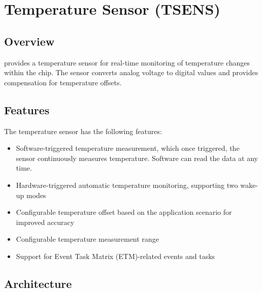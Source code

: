 \documentclass[main\_\_EN.tex]{subfiles}
\begin{document}

\ifglobal
\else
    {\let\clearpage\relax \listoftodos}
    {\let\clearpage\relax \listofdonetodos}
    \tableofcontents
\fi



\hypertarget{tmpsen}{}
\chapter{Temperature Sensor (TSENS)}
\label{mod:tmpsen}

\section{Overview}

\chipname{} provides a temperature sensor for real-time monitoring of temperature changes within the chip. The sensor converts analog voltage to digital values and provides compensation for temperature offsets.

\section{Features}

The temperature sensor has the following features:

\begin{itemize}
    \item Software-triggered temperature measurement, which once triggered, the sensor continuously measures temperature. Software can read the data at any time.
    \item Hardware-triggered automatic temperature monitoring, supporting two wake-up modes
    \item Configurable temperature offset based on the application scenario for improved accuracy
    \item Configurable temperature measurement range
\item Support for Event Task Matrix (ETM)-related events and tasks
\end{itemize}

\section{Architecture}
\end{document}
